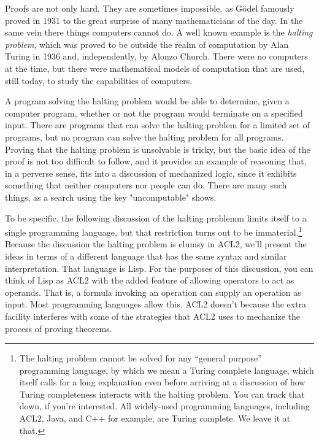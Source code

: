 Proofs are not only hard.
They are sometimes impossible, as G\"odel famously proved in 1931
to the great surprise of many mathematicians of the day.
In the same vein there things computers cannot do.
A well known example is the  \emph{halting problem}, which
was proved to be outside the realm of computation
by Alan Turing in 1936
and, independently, by Alonzo Church.
There were no computers at the time,
but there were mathematical models of computation
that are used, still today, to study the capabilities of computers.

A program solving the
halting problem would be able to determine,
given a computer program, whether or not the program would terminate
on a specified input.
There are programs that can solve the halting problem for
a limited set of programs,
but no program can solve the halting problem for all programs.
Proving that the halting problem is unsolvable is tricky,
but the basic idea of the proof is not too difficult to follow, and
it provides an example of reasoning that,
in a perverse sense, fits into a discussion of mechanized logic,
since it exhibits something that neither computers
nor people can do. There are many such things, as a search
using the key "uncomputable" shows.

To be specific, the following discussion of the halting problemm
limits itself to a single programming language, but
that restriction turns out to be immaterial.\footnote{The
halting problem cannot be solved
for any ``general purpose'' programming language,
by which we mean a Turing complete language,
which itself calls for a long explanation even
before arriving at a discussion of how Turing completeness
interacts with the halting problem.
You can track that down, if you're interested.
All widely-used programming languages,
including ACL2, Java, and C++ for example, are Turing complete.
We leave it at that.}
Because the discussion the halting problem is clumsy in ACL2,
we'll present the ideas in terms of a different
language that has the same syntax
and similar interpretation. That language is Lisp.
For the purposes of this discussion,
you can think of Lisp as ACL2 with the added feature
of allowing operators to act as operands.
That is, a formula invoking an operation can supply
an operation as input.
Most programming languages allow this.
ACL2 doesn't because the extra facility
interferes with some of the strategies that ACL2 uses
to mechanize the process of proving theorems.

